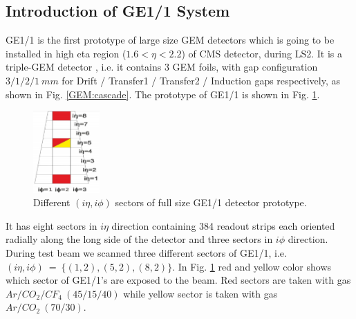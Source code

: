 
\subsection{Introduction of GE1/1 System}
GE1/1 is the first prototype of large size GEM detectors which is going to be installed in high eta region ($1.6<\eta<2.2$) of CMS detector, during LS2. It is a triple-GEM detector \cite{Colaleo:2021453}, i.e. it contains 3 GEM foils, with gap configuration $3/1/2/1~mm$ for Drift / Transfer1 / Transfer2 / Induction gaps respectively, as shown in Fig. \ref{GEM:cascade}. The prototype of GE1/1 is shown in Fig. \ref{GE11}. 
\begin{figure}[!htbp]
\centering
\includegraphics[width=1.0in]{figures/GEM/GE11.png}
\caption{Different $(i\eta,i\phi)$ sectors of full size GE1/1 detector prototype.}
\label{GE11}
\end{figure}
It has eight sectors in $i\eta$ direction containing 384 readout strips each oriented radially along the long side of the detector and three sectors in $i\phi$ direction. During test beam we scanned three different sectors of GE1/1, i.e. $(i\eta,i\phi)~=~\{(1,2),(5,2),(8,2)\}$. In Fig. \ref{GE11} red and yellow color shows which sector of GE1/1's are exposed to the beam. Red sectors are taken with gas $Ar/CO_2/CF_4~(45/15/40)$ while yellow sector is taken with gas $Ar/CO_2~(70/30)$. 


